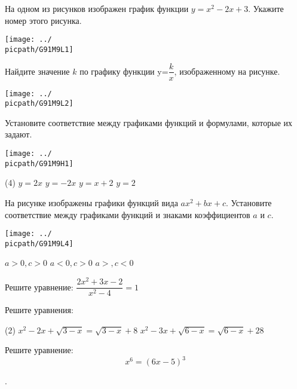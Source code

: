 \begin{class}[number=3]
	\begin{listofex}
		\item На одном из рисунков изображен график функции \(y=x^2-2x+3\). Укажите номер этого рисунка.
		\begin{center}
			\texttt{[image: ../\\picpath/G91M9L1]}
		\end{center}
		\item Найдите значение \( k \) по графику функции y=\(\dfrac{k}{x}\),  изображенному на рисунке.
		\begin{center}
			\texttt{[image: ../\\picpath/G91M9L2]}
		\end{center}
		\item Установите соответствие между графиками функций и формулами, которые их задают.
		\begin{center}
			\texttt{[image: ../\\picpath/G91M9H1]}
		\end{center}
		\begin{tasks}(4)
			\task \( y=2x \)
			\task \( y=-2x \)
			\task \( y=x+2 \)
			\task \( y=2 \)
		\end{tasks}
		\item На рисунке изображены графики функций вида \(ax^2+bx+c\). Установите соответствие между графиками функций и знаками коэффициентов \(a\) и \(c\).
		\begin{center}
			\texttt{[image: ../\\picpath/G91M9L4]}
		\end{center}
		\begin{tasks}
			\task \( a>0, c>0 \)
			\task \( a<0, c>0 \)
			\task \( a>, c<0 \)
		\end{tasks}
		\item Решите уравнение: \( \dfrac{2x^2+3x-2}{x^2-4}=1 \)
		\item Решите уравнения:
		\begin{tasks}(2)
			\task \( x^2-2x+\sqrt{3-x}=\sqrt{3-x}+8 \)
			\task \( x^2-3x+\sqrt{6-x}=\sqrt{6-x}+28 \)
		\end{tasks}
		\item Решите уравнение:
		\[x^6=(6x-5)^3\]
	\end{listofex}
\end{class}

\begin{class}[number=4]
	\begin{listofex}
		\item .
	\end{listofex}
\end{class}

